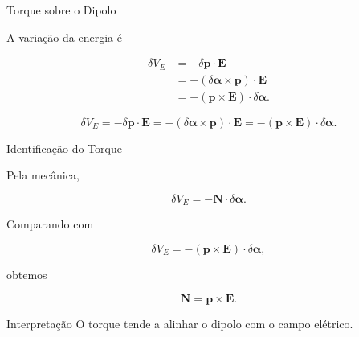 \documentclass[aspectratio=169]{beamer}
\begin{document}
\begin{frame}{Torque sobre o Dipolo}

A variação da energia é

\begin{align}
\delta V_E
&=
-\delta \mathbf p\cdot \mathbf E
\\[0.2cm]
&=
-(\delta\boldsymbol{\alpha}\times \mathbf p)\cdot \mathbf E
\\[0.2cm]
&=
-(\mathbf p\times \mathbf E)\cdot \delta\boldsymbol{\alpha}.
\end{align}

\begin{eqbox}
\begin{equation}
\delta V_E
=
-\delta \mathbf p\cdot \mathbf E
=
-(\delta\boldsymbol{\alpha}\times \mathbf p)\cdot \mathbf E
=
-(\mathbf p\times \mathbf E)\cdot \delta\boldsymbol{\alpha}.
\tag{4.29}
\label{eq:4.29}
\end{equation}
\end{eqbox}

\end{frame}

\begin{frame}{Identificação do Torque}

Pela mecânica,

\begin{equation}
\delta V_E
=
-\mathbf N\cdot \delta\boldsymbol{\alpha}.
\end{equation}

Comparando com

\begin{equation}
\delta V_E
=
-(\mathbf p\times \mathbf E)\cdot \delta\boldsymbol{\alpha},
\end{equation}

obtemos

\begin{eqbox}
\begin{equation}
\mathbf N
=
\mathbf p\times \mathbf E.
\tag{4.24}
\label{eq:4.24}
\end{equation}
\end{eqbox}

\begin{mybox}{Interpretação}
O torque tende a alinhar o dipolo com o campo elétrico.
\end{mybox}

\end{frame}
\end{document}
